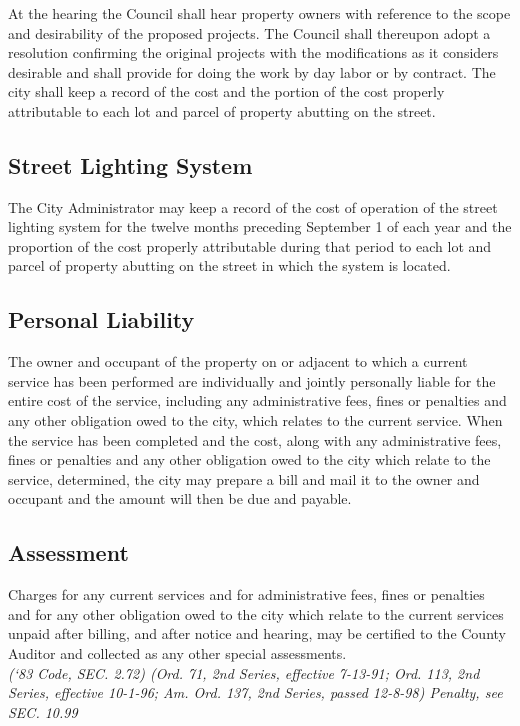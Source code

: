 \subsubsection{}
At the hearing the Council shall hear property owners with reference to the scope and desirability of the proposed projects.  The Council shall thereupon adopt a resolution confirming the original projects with the modifications as it considers desirable and shall provide for doing the work by day labor or by contract.  The city shall keep a record of the cost and the portion of the cost properly attributable to each lot and parcel of property abutting on the street.
\subsection{Street Lighting System}
The City Administrator may keep a record of the cost of operation of the street lighting system for the twelve months preceding September 1 of each year and the proportion of the cost properly attributable during that period to each lot and parcel of property abutting on the street in which the system is located.
\subsection{Personal Liability}
The owner and occupant of the property on or adjacent to which a current service has been performed are individually and jointly personally liable for the entire cost of the service, including any administrative fees, fines or penalties and any other obligation owed to the city, which relates to the current service. When the service has been completed and the cost, along with any administrative fees, fines or penalties and any other obligation owed to the city which relate to the service, determined, the city may prepare a bill and mail it to the owner and occupant and the amount will then be due and payable.
\subsection{Assessment}
Charges for any current services and for administrative fees, fines or penalties and for any other obligation owed to the city which relate to the current services unpaid after billing, and after notice and hearing, may be certified to the County Auditor and collected as any other special assessments.\\
\emph{(‘83 Code, SEC. 2.72)  (Ord. 71, 2nd Series, effective 7-13-91; Ord. 113, 2nd Series, effective 10-1-96; Am. Ord. 137, 2nd Series, passed 12-8-98)  Penalty, see SEC. 10.99}

